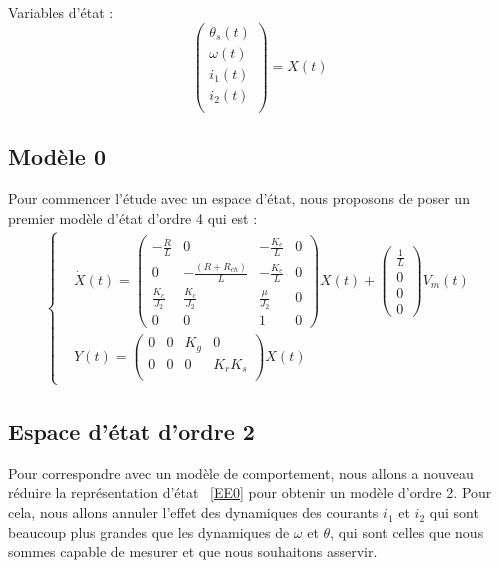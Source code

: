 \hspace{5mm} \textbullet \hspace{5mm} Variables d'état :
\begin{equation}
\begin{pmatrix}
\theta_s(t)\\
\omega(t)\\
i_1(t)\\
i_2(t)\\
\end{pmatrix}
=
X(t)
\end{equation}
\subsection{Modèle 0}
Pour commencer l'étude avec un espace d'état, nous proposons de poser un premier modèle d'état d'ordre 4 qui est :
\begin{align}
\label{EE0}
\left\lbrace
\begin{aligned}
&\dot{X}(t) = \begin{pmatrix}
-\frac{R}{L}	& 	    0				&   -\frac{K_e}{L}	& 0\\
      0			&  -\frac{(R+R_{ch})}{L}	&	-\frac{K_e}{L}	& 0\\
\frac{K_c}{J_2}	&	\frac{K_c}{J_2}		&	\frac{\mu}{J_2}	&	0\\
0&	0&	1&	0
\end{pmatrix}X(t)+\begin{pmatrix}
\frac{1}{L}\\0\\0\\0
\end{pmatrix}V_m(t)\\
&Y(t) = \begin{pmatrix}
0&	0&	K_g	&	0\\
0&	0&	0	&	K_rK_s\\
\end{pmatrix}X(t)
\end{aligned}
\right.
\end{align}
\subsection{Espace d'état d'ordre 2}
Pour correspondre avec un modèle de comportement, nous allons a nouveau réduire la représentation d'état ~\eqref{EE0} pour obtenir un modèle d'ordre 2. Pour cela, nous allons annuler l'effet des dynamiques des courants $i_1$ et $i_2$ qui sont beaucoup plus grandes que les dynamiques de $\omega$ et $\theta$, qui sont celles que nous sommes capable de mesurer et que nous souhaitons asservir.\\

